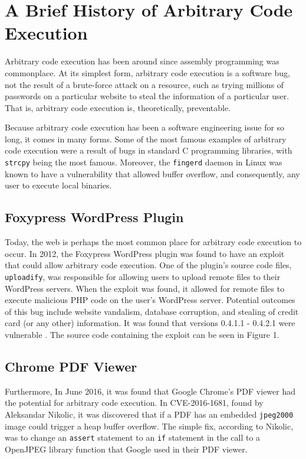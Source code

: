 \section{A Brief History of Arbitrary Code Execution}

Arbitrary code execution has been around since assembly programming was commonplace. At its simplest form, arbitrary code execution is a software bug, not the result of a brute-force attack on a resource, such as trying millions of passwords on a particular website to steal the information of a particular user. That is, arbitrary code execution is, theoretically, preventable.

Because arbitrary code execution has been a software engineering issue for so long, it comes in many forms. Some of the most famous examples of arbitrary code execution were a result of bugs in standard C programming libraries, with \texttt{strcpy} being the most famous. Moreover, the \texttt{fingerd} daemon in Linux was known to have a vulnerability that allowed buffer overflow, and consequently, any user to execute local binaries.

\subsection{Foxypress WordPress Plugin}

Today, the web is perhaps the most common place for arbitrary code execution to occur. In 2012, the Foxypress WordPress plugin was found to have an exploit that could allow arbitrary code execution. One of the plugin's source code files, \texttt{uploadify}, was responsible for allowing users to upload remote files to their WordPress servers. When the exploit was found, it allowed for remote files to execute malicious PHP code on the user's WordPress server. Potential outcomes of this bug include website vandalism, database corruption, and stealing of credit card (or any other) information. It was found that versions 0.4.1.1 - 0.4.2.1 were vulnerable \cite{foxypress_2012}. The source code containing the exploit can be seen in Figure 1.

\subsection{Chrome PDF Viewer}

Furthermore, In June 2016, it was found that Google Chrome's PDF viewer had the potential for arbitrary code execution. In CVE-2016-1681, found by Aleksandar Nikolic, it was discovered that if a PDF has an embedded \texttt{jpeg2000} image could trigger a heap buffer overflow. The simple fix, according to Nikolic, was to change an \texttt{assert} statement to an \texttt{if} statement in the call to a  OpenJPEG library function that Google used in their PDF viewer. \cite{chrome_pdf_2016}

